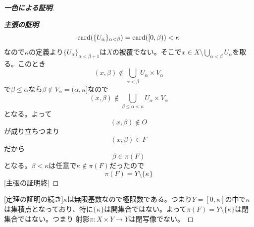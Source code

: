 \documentclass[leqno]{jsarticle}
\newcommand{\al}{\alpha}
\newcommand{\be}{\beta}
\newcommand{\card}{\text{{\rm card}}}
\newcommand{\kk}{\kappa}
\begin{document}
\begin{proof}[\textbf{一色による証明}]
\begin{proof}[\textbf{主張の証明}]
\[
\card(\{U_{\al}\}_{\al<\be})= \card([0,\be))<\kk
\]
なので$\kk$の定義より$\{U_{\al}\}_{\al<\be+1}$は$X$の被覆でない。そこで$x\in X\setminus \bigcup_{\al<\be}U_{\al}$を取る。このとき
\[
(x,\be)\not\in \bigcup_{\al<\be}U_{\al}\times V_{\al}
\]
で$\be\le\al$なら$\be\not\in V_{\al}=(\al,\kk]$なので
\[
(x,\be) \not\in \bigcup_{\be\le \al <\kk}U_{\al}\times V_{\al}
\]
となる。よって
\[
(x,\be)\not\in O
\]
が成り立ちつまり
\[
(x,\be)\in F
\]だから
\[
\be\in \pi(F)
\]
となる。$\be<\kk$は任意で$\kk \not\in \pi(F)$だったので
\[
\pi(F)=Y\setminus \{\kk\}
\]
[主張の証明終]\end{proof}
[定理の証明の続き]$\kk$は無限基数なので極限数である。つまり$Y=[0,\kk]$の中で$\kk$は集積点となっており、特に$\{\kk\}$は開集合ではない。よって$\pi(F)=Y\setminus \{\kk\}$は閉集合ではない。つまり
射影$\pi: X\times Y\to Y$は閉写像でない。
\end{proof}
\end{document}
